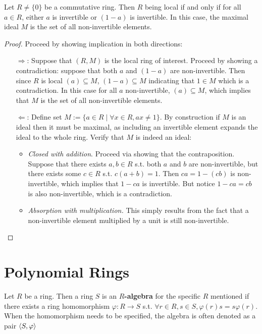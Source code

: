 \documentclass{article}
\begin{document}
\begin{proposition}
    Let $R\neq \{0\}$ be a commutative ring. Then $R$ being local if and only if for all $a\in R$, either $a$ is invertible or $(1-a)$ is invertible. In this case, the maximal ideal $M$ is the set of all non-invertible elements. 
\end{proposition}

\begin{proof}
    Proceed by showing implication in both directions:
    \begin{itemize}
        \item[$\Rightarrow$:] Suppose that $(R, M)$ is the local ring of interest. Proceed by showing a contradiction: suppose that both $a$ and $(1-a)$ are non-invertible. Then since $R$ is local $(a) \subseteq M$, $(1-a) \subseteq M$ indicating that $1\in M$ which is a contradiction. In this case for all $a$ non-invertible, $(a) \subseteq M$, which implies that $M$ is the set of all non-invertible elements. 
        \item[$\Leftarrow$:] Define set $M := \{ a\in R \mid \forall x\in R, ax \neq 1 \}$. By construction if $M$ is an ideal then it must be maximal, as including an invertible element expands the ideal to the whole ring. Verify that $M$ is indeed an ideal:
            \begin{itemize}
                \item \emph{Closed with addition}. Proceed via showing that the contraposition. Suppose that there exists $a, b\in R$ s.t. both $a$ and $b$ are non-invertible, but there exists some $c\in R$ s.t. $c(a + b) = 1$. Then $ca = 1 - (cb)$ is non-invertible, which implies that $1 - ca$ is invertible. But notice $1 - ca = cb$ is also non-invertible, which is a contradiction.
                \item \emph{Absorption with multiplication.} This simply results from the fact that a non-invertible element multiplied by a unit is still non-invertible. 
            \end{itemize}
    \end{itemize}
\end{proof}

\newpage
\section{Polynomial Rings}

\begin{definition}[R-algebra]
    Let $R$ be a ring. Then a ring $S$ is an \textbf{$R$-algebra} for the specific $R$ mentioned if there exists a ring homomorphism $\varphi: R\to S$ s.t. $\forall r\in R, s\in S, \varphi(r)s = s\varphi(r)$. When the homomorphism needs to be specified, the algebra is often denoted as a pair $\langle S, \varphi \rangle$
\end{definition}
\end{document}
